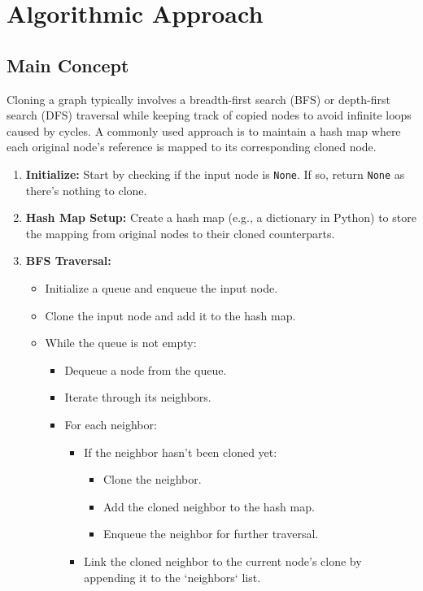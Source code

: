 \section*{Algorithmic Approach}

\subsection*{Main Concept}
Cloning a graph typically involves a breadth-first search (BFS) or depth-first search (DFS) traversal while keeping track of copied nodes to avoid infinite loops caused by cycles. A commonly used approach is to maintain a hash map where each original node's reference is mapped to its corresponding cloned node.

\begin{enumerate}
    \item \textbf{Initialize:} Start by checking if the input node is \texttt{None}. If so, return \texttt{None} as there's nothing to clone.
    
    \item \textbf{Hash Map Setup:} Create a hash map (e.g., a dictionary in Python) to store the mapping from original nodes to their cloned counterparts.
    
    \item \textbf{BFS Traversal:}
    \begin{itemize}
        \item Initialize a queue and enqueue the input node.
        \item Clone the input node and add it to the hash map.
        \item While the queue is not empty:
        \begin{itemize}
            \item Dequeue a node from the queue.
            \item Iterate through its neighbors.
            \item For each neighbor:
            \begin{itemize}
                \item If the neighbor hasn't been cloned yet:
                \begin{itemize}
                    \item Clone the neighbor.
                    \item Add the cloned neighbor to the hash map.
                    \item Enqueue the neighbor for further traversal.
                \end{itemize}
                \item Link the cloned neighbor to the current node's clone by appending it to the `neighbors` list.
            \end{itemize}
        \end{itemize}
    \end{itemize}
\end{enumerate}

